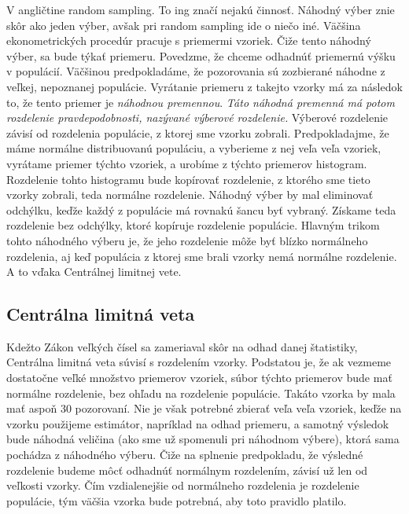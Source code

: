 V angličtine random sampling. To ing značí nejakú činnosť. Náhodný výber
znie skôr ako jeden výber, avšak pri random sampling ide o niečo iné.
Väčšina ekonometrických procedúr pracuje s priemermi vzoriek. Čiže tento
náhodný výber, sa bude týkať priemeru. Povedzme, že chceme odhadnúť
priemernú výšku v populácií. Väčšinou predpokladáme, že pozorovania sú
zozbierané náhodne z veľkej, nepoznanej populácie. Vyrátanie priemeru z
takejto vzorky má za následok to, že tento priemer je \emph{náhodnou
premennou}. \emph{Táto náhodná premenná má potom rozdelenie
pravdepodobnosti, nazývané výberové rozdelenie.} Výberové rozdelenie
závisí od rozdelenia populácie, z ktorej sme vzorku zobrali.
Predpokladajme, že máme normálne distribuovanú populáciu, a vyberieme z
nej veľa veľa vzoriek, vyrátame priemer týchto vzoriek, a urobíme z
týchto priemerov histogram. Rozdelenie tohto histogramu bude kopírovať
rozdelenie, z ktorého sme tieto vzorky zobrali, teda normálne
rozdelenie. Náhodný výber by mal eliminovať odchýlku, keďže každý z
populácie má rovnakú šancu byť vybraný. Získame teda rozdelenie bez
odchýlky, ktoré kopíruje rozdelenie populácie. Hlavným trikom tohto
náhodného výberu je, že jeho rozdelenie môže byť blízko normálneho
rozdelenia, aj keď populácia z ktorej sme brali vzorky nemá normálne
rozdelenie. A to vďaka Centrálnej limitnej vete.

\hypertarget{centruxe1lna-limitnuxe1-veta}{%
\subsection{Centrálna limitná veta}\label{centruxe1lna-limitnuxe1-veta}}

Kdežto Zákon veľkých čísel sa zameriaval skôr na odhad danej štatistiky,
Centrálna limitná veta súvisí s rozdelením vzorky. Podstatou je, že ak
vezmeme dostatočne veľké množstvo priemerov vzoriek, súbor týchto
priemerov bude mať normálne rozdelenie, bez ohľadu na rozdelenie
populácie. Takáto vzorka by mala mať aspoň 30 pozorovaní. Nie je však
potrebné zbierať veľa veľa vzoriek, keďže na vzorku použijeme estimátor,
napríklad na odhad priemeru, a samotný výsledok bude náhodná veličina
(ako sme už spomenuli pri náhodnom výbere), ktorá sama pochádza z
náhodného výberu. Čiže na splnenie predpokladu, že výsledné rozdelenie
budeme môcť odhadnúť normálnym rozdelením, závisí už len od veľkosti
vzorky. Čím vzdialenejšie od normálneho rozdelenia je rozdelenie
populácie, tým väčšia vzorka bude potrebná, aby toto pravidlo platilo.

\newpage

